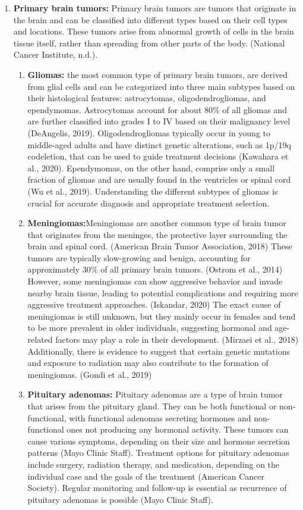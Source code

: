 \documentclass[12pt,oneside]{report}
\begin{document}
\begin{enumerate}
\item \textbf{Primary brain tumors:}
Primary brain tumors are tumors that originate in the brain and can be classified into different types based on their cell types and locations. These tumors arise from abnormal growth of cells in the brain tissue itself, rather than spreading from other parts of the body. (National Cancer Institute, n.d.).

\begin{enumerate}
\item 
\textbf{Gliomas:} the most common type of primary brain tumors, are derived from glial cells and can be categorized into three main subtypes based on their histological features: astrocytomas, oligodendrogliomas, and ependymomas. Astrocytomas account for about 80\% of all gliomas and are further classified into grades I to IV based on their malignancy level (DeAngelis, 2019). Oligodendrogliomas typically occur in young to middle-aged adults and have distinct genetic alterations, such as 1p/19q codeletion, that can be used to guide treatment decisions (Kawahara et al., 2020). Ependymomas, on the other hand, comprise only a small fraction of gliomas and are usually found in the ventricles or spinal cord (Wu et al., 2019). Understanding the different subtypes of gliomas is crucial for accurate diagnosis and appropriate treatment selection.

\item 
\textbf{Meningiomas:}Meningiomas are another common type of brain tumor that originates from the meninges, the protective layer surrounding the brain and spinal cord. (American Brain Tumor Association, 2018) These tumors are typically slow-growing and benign, accounting for approximately 30\% of all primary brain tumors. (Ostrom et al., 2014) However, some meningiomas can show aggressive behavior and invade nearby brain tissue, leading to potential complications and requiring more aggressive treatment approaches. (Iskandar, 2020) The exact cause of meningiomas is still unknown, but they mainly occur in females and tend to be more prevalent in older individuals, suggesting hormonal and age-related factors may play a role in their development. (Mirzaei et al., 2018) Additionally, there is evidence to suggest that certain genetic mutations and exposure to radiation may also contribute to the formation of meningiomas. (Gondi et al., 2019)

\item 
\textbf{Pituitary adenomas:}
Pituitary adenomas are a type of brain tumor that arises from the pituitary gland. They can be both functional or non-functional, with functional adenomas secreting hormones and non-functional ones not producing any hormonal activity. These tumors can cause various symptoms, depending on their size and hormone secretion patterns (Mayo Clinic Staff). Treatment options for pituitary adenomas include surgery, radiation therapy, and medication, depending on the individual case and the goals of the treatment (American Cancer Society). Regular monitoring and follow-up is essential as recurrence of pituitary adenomas is possible (Mayo Clinic Staff).


\end{enumerate}
\end{enumerate}
\end{document}
